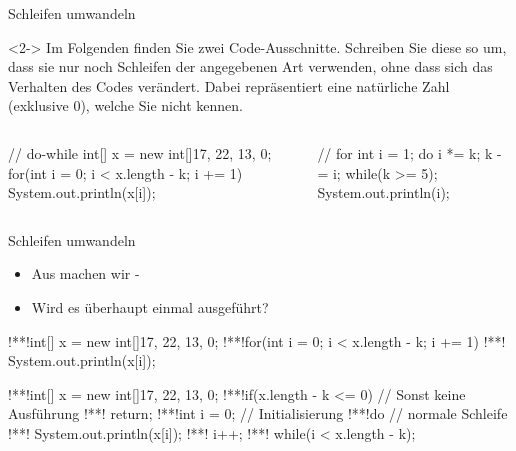 {
\begin{frame}[fragile,c]{Schleifen umwandeln}
\begin{uncoverenv}<2->
\flushleft Im Folgenden finden Sie zwei Code-Ausschnitte. Schreiben Sie diese so um, dass sie nur noch Schleifen der angegebenen Art verwenden, ohne dass sich das Verhalten des Codes verändert. Dabei repräsentiert  eine natürliche Zahl (exklusive \(0\)), welche Sie nicht kennen.
\begin{columns}[onlytextwidth,T]
\begin{plainjava}
// do-while
int[] x = new int[]{17, 22, 13, 0};
for(int i = 0; i < x.length - k; i += 1) {
    System.out.println(x[i]);
}
\end{plainjava}
\begin{plainjava}
// for
int i = 1;
do {
    i *= k;
    k -= i;
} while(k >= 5);
System.out.println(i);
\end{plainjava}
\end{columns}
\end{uncoverenv}
%
\end{frame}
\SidebarReset

\SidebarSolution
\begin{frame}[fragile,c]{Schleifen umwandeln}
\begin{itemize}[<+(1)->]
   \itemsep3pt
   \item Aus  machen wir -
   \item Wird es überhaupt einmal ausgeführt?
\end{itemize}
\begin{plainjava}
!**!int[] x = new int[]{17, 22, 13, 0};
!**!for(int i = 0; i < x.length - k; i += 1)
!**!    System.out.println(x[i]);
\end{plainjava}
\vspace*{-1.4\baselineskip}\par\null\qquad\paletteA{\faCaretDown}
\begin{plainjava}
!**!int[] x = new int[]{17, 22, 13, 0};
!**!if(x.length - k <= 0) // Sonst keine Ausführung
!**!   return;
!**!int i = 0; // Initialisierung
!**!do { // normale Schleife
!**!   System.out.println(x[i]);
!**!   i++;
!**!} while(i < x.length - k);
\end{plainjava}
\end{frame}

}
